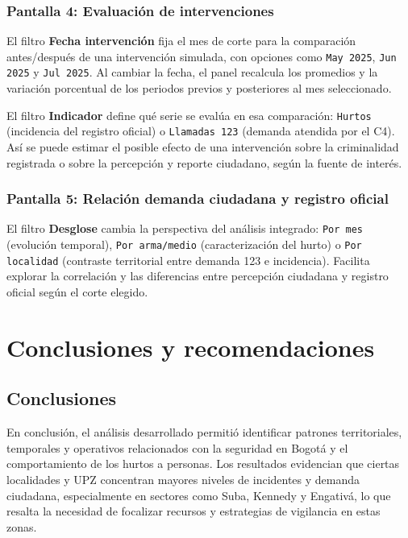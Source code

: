 \documentclass[12pt,letterpaper]{article}
\begin{document}
\subsubsection{Pantalla 4: Evaluación de intervenciones}

El filtro \textbf{Fecha intervención} fija el mes de corte para la comparación antes/después de una intervención simulada, con opciones como \texttt{May 2025}, \texttt{Jun 2025} y \texttt{Jul 2025}. Al cambiar la fecha, el panel recalcula los promedios y la variación porcentual de los periodos previos y posteriores al mes seleccionado.

El filtro \textbf{Indicador} define qué serie se evalúa en esa comparación: \texttt{Hurtos} (incidencia del registro oficial) o \texttt{Llamadas 123} (demanda atendida por el C4). Así se puede estimar el posible efecto de una intervención sobre la criminalidad registrada o sobre la percepción y reporte ciudadano, según la fuente de interés.

\subsubsection{Pantalla 5: Relación demanda ciudadana y registro oficial}

El filtro \textbf{Desglose} cambia la perspectiva del análisis integrado: \texttt{Por mes} (evolución temporal), \texttt{Por arma/medio} (caracterización del hurto) o \texttt{Por localidad} (contraste territorial entre demanda 123 e incidencia). Facilita explorar la correlación y las diferencias entre percepción ciudadana y registro oficial según el corte elegido.

\section{Conclusiones y recomendaciones}

\subsection{Conclusiones}

En conclusión, el análisis desarrollado permitió identificar patrones territoriales, temporales y operativos relacionados con la seguridad en Bogotá y el comportamiento de los hurtos a personas. Los resultados evidencian que ciertas localidades y UPZ concentran mayores niveles de incidentes y demanda ciudadana, especialmente en sectores como Suba, Kennedy y Engativá, lo que resalta la necesidad de focalizar recursos y estrategias de vigilancia en estas zonas.
\end{document}
